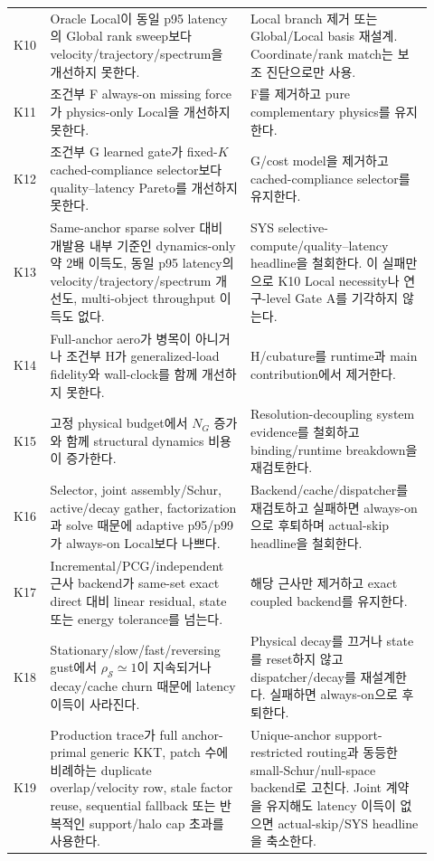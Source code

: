 \documentclass[10pt,a4paper]{article}
\begin{document}
\begin{longtable}{L{0.06\linewidth}L{0.45\linewidth}L{0.41\linewidth}}
K10 & Oracle Local이 동일 p95 latency의 Global rank sweep보다 velocity/trajectory/spectrum을 개선하지 못한다. & Local branch 제거 또는 Global/Local basis 재설계. Coordinate/rank match는 보조 진단으로만 사용. \\
K11 & 조건부 F always-on missing force가 physics-only Local을 개선하지 못한다. & F를 제거하고 pure complementary physics를 유지한다. \\
K12 & 조건부 G learned gate가 fixed-\(K\) cached-compliance selector보다 quality--latency Pareto를 개선하지 못한다. & G/cost model을 제거하고 cached-compliance selector를 유지한다. \\
K13 & Same-anchor sparse solver 대비 개발용 내부 기준인 dynamics-only 약 2배 이득도,
동일 p95 latency의 velocity/trajectory/spectrum 개선도, multi-object throughput 이득도 없다.
& SYS selective-compute/quality--latency headline을 철회한다. 이 실패만으로 K10 Local necessity나 연구-level Gate A를 기각하지 않는다. \\
K14 & Full-anchor aero가 병목이 아니거나 조건부 H가 generalized-load fidelity와 wall-clock를 함께 개선하지 못한다. & H/cubature를 runtime과 main contribution에서 제거한다. \\
\addlinespace
K15 & 고정 physical budget에서 \(N_G\) 증가와 함께 structural dynamics 비용이 증가한다. & Resolution-decoupling system evidence를 철회하고 binding/runtime breakdown을 재검토한다. \\
\addlinespace
K16 & Selector, joint assembly/Schur, active/decay gather, factorization과 solve 때문에 adaptive p95/p99가 always-on Local보다 나쁘다. & Backend/cache/dispatcher를 재검토하고 실패하면 always-on으로 후퇴하며 actual-skip headline을 철회한다. \\
\addlinespace
K17 & Incremental/PCG/independent 근사 backend가 same-set exact direct 대비 linear residual, state 또는 energy tolerance를 넘는다. & 해당 근사만 제거하고 exact coupled backend를 유지한다. \\
\addlinespace
K18 & Stationary/slow/fast/reversing gust에서 \(\rho_{\mathcal S}\simeq1\)이 지속되거나 decay/cache churn 때문에 latency 이득이 사라진다. & Physical decay를 끄거나 state를 reset하지 않고 dispatcher/decay를 재설계한다. 실패하면 always-on으로 후퇴한다. \\
\addlinespace
K19 & Production trace가 full anchor-primal generic KKT, patch 수에 비례하는 duplicate overlap/velocity row, stale factor reuse, sequential fallback 또는 반복적인 support/halo cap 초과를 사용한다. & Unique-anchor support-restricted routing과 동등한 small-Schur/null-space backend로 고친다. Joint 계약을 유지해도 latency 이득이 없으면 actual-skip/SYS headline을 축소한다. \\

\end{longtable}
\end{document}

